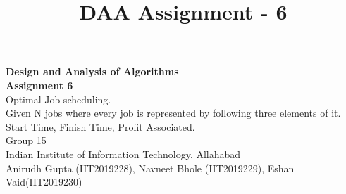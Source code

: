 \documentclass[10pt]{article}
\author{}
\title{\Large{DAA Assignment - 6}}
\begin{document}
	
	\begin{center}
		{\Large \textbf{Design and Analysis of Algorithms}}\\
		\vspace{1em}
		{\Large \textbf{Assignment 6}}\\
		\vspace{1em}
		{\large Optimal Job scheduling.\\Given N jobs where every job is represented by following three elements of it. Start Time, Finish Time, Profit Associated.
}\\
		\vspace{1em}
		{\large Group 15}\\
		\vspace{1em}
		\large{Indian Institute of Information Technology, Allahabad}\\
		\vspace{1em}
		\large{Anirudh Gupta (IIT2019228), Navneet Bhole (IIT2019229), Eshan Vaid(IIT2019230)}\\
		\vspace{2.5em}
		
	\end{center}
	
\end{document}
